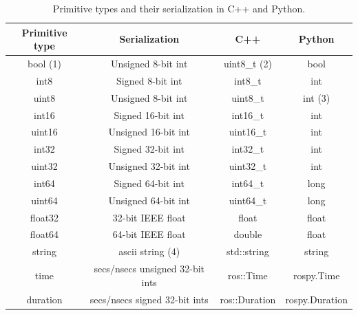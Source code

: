 \documentclass[../../main]{subfiles}
\begin{document}
\begin{table}[ht]
    \centering
\begin{tcolorbox}[
    colback=red!5!white,colframe=red!75!black,
    title={\textbf{Built-in Field Types for Message Definition}},
    fonttitle=\bfseries, coltitle=white, width=\linewidth
]
    \begin{tabular}{|c|c|c|c|}
    \hline
    \textbf{Primitive type} & \textbf{Serialization} & \textbf{C++} & \textbf{Python} \\ \hline
    bool (1) & Unsigned 8-bit int & uint8\_t (2) & bool \\ \hline
    int8 & Signed 8-bit int & int8\_t & int \\ \hline
    uint8 & Unsigned 8-bit int & uint8\_t & int (3) \\ \hline
    int16 & Signed 16-bit int & int16\_t & int \\ \hline
    uint16 & Unsigned 16-bit int & uint16\_t & int \\ \hline
    int32 & Signed 32-bit int & int32\_t & int \\ \hline
    uint32 & Unsigned 32-bit int & uint32\_t & int \\ \hline
    int64 & Signed 64-bit int & int64\_t & long \\ \hline
    uint64 & Unsigned 64-bit int & uint64\_t & long \\ \hline
    float32 & 32-bit IEEE float & float & float \\ \hline
    float64 & 64-bit IEEE float & double & float \\ \hline
    string & ascii string (4) & std::string & string \\ \hline
    time & secs/nsecs unsigned 32-bit ints & ros::Time & rospy.Time \\ \hline
    duration & secs/nsecs signed 32-bit ints & ros::Duration & rospy.Duration \\ \hline
    \end{tabular}
    \caption{Primitive types and their serialization in C++ and Python.}
    \label{tab:my_label}
\end{tcolorbox}
\end{table}
\end{document}
